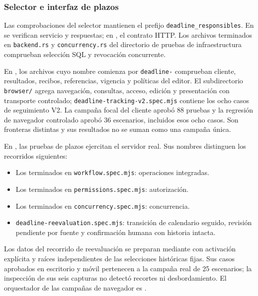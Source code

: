 \subsubsection{Selector e interfaz de plazos}

Las comprobaciones del selector mantienen el prefijo \texttt{deadline\_responsibles}. En  se verifican servicio y respuestas; en , el contrato HTTP. Los archivos terminados en \texttt{backend.rs} y \texttt{concurrency.rs} del directorio de pruebas de infraestructura comprueban selección SQL y revocación concurrente.

En , los archivos cuyo nombre comienza por \texttt{deadline-} comprueban cliente, resultados, recibos, referencias, vigencia y políticas del editor. El subdirectorio \texttt{browser/} agrega navegación, consultas, acceso, edición y presentación con transporte controlado; \texttt{deadline-tracking-v2.spec.mjs} contiene los ocho casos de seguimiento V2. La campaña focal del cliente aprobó 88 pruebas y la regresión de navegador controlado aprobó 36 escenarios, incluidos esos ocho casos. Son fronteras distintas y sus resultados no se suman como una campaña única.

En , las pruebas de plazos ejercitan el servidor real. Sus nombres distinguen los recorridos siguientes:
\begin{itemize}
  \item Los terminados en \texttt{workflow.spec.mjs}: operaciones integradas.
  \item Los terminados en \texttt{permissions.spec.mjs}: autorización.
  \item Los terminados en \texttt{concurrency.spec.mjs}: concurrencia.
  \item \texttt{deadline-reevaluation.spec.mjs}: transición de calendario seguido, revisión pendiente por fuente y confirmación humana con historia intacta.
\end{itemize}
\begingroup
\raggedright
Los datos del recorrido de reevaluación se preparan mediante  con activación explícita y raíces independientes de las selecciones históricas fijas. Sus casos aprobados en escritorio y móvil pertenecen a la campaña real de 25 escenarios; la inspección de sus seis capturas no detectó recortes ni desbordamiento. El orquestador de las campañas de navegador es .
\par
\endgroup

